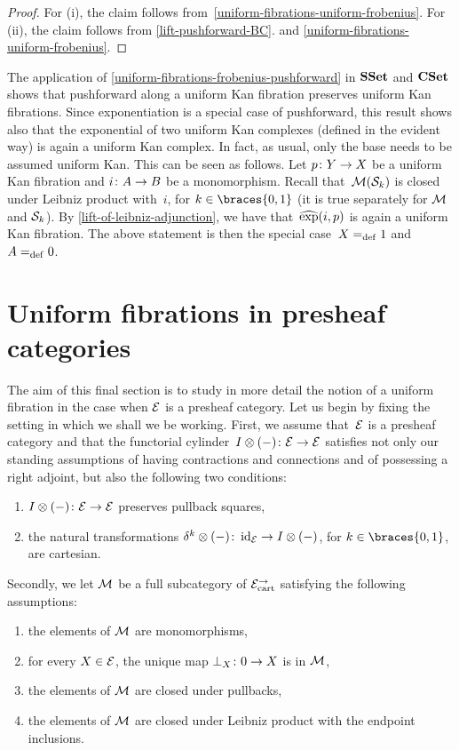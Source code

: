 \documentclass[reqno,10pt,a4paper,oneside,draft]{amsart}
\begin{document}
{{\begin{proof}
For (i), the claim follows from~\cref{uniform-fibrations-uniform-frobenius}. For (ii), the claim follows from \cref{lift-pushforward-BC}.
and \cref{uniform-fibrations-uniform-frobenius}.
\end{proof}


\begin{example} The application of \cref{uniform-fibrations-frobenius-pushforward} in $\SSet$
and $\CSet$ shows that pushforward along a uniform Kan fibration preserves uniform Kan fibrations. 
Since exponentiation is a special case of pushforward, this result shows also that the exponential of two uniform Kan complexes (defined in the evident way) is again a uniform Kan complex.
In fact, as usual, only the base needs to be assumed uniform Kan. This can be seen as follows.
Let $p \co Y \to X$ be a uniform Kan fibration and $i \co A \to B$ be a monomorphism.
Recall that~$\cal{M}(\cal{S}_k)$ is closed under Leibniz product with~$i$, for $k \in \braces{0, 1}$ (it is true separately for $\cal{M}$ and $\cal{S}_k$).
By \cref{lift-of-leibniz-adjunction}, we have that~$\hatexp(i, p)$ is again a uniform Kan fibration.
The above statement is then the special case~$X \defeq 1$ and $A \defeq 0$.
\end{example} 


\section{Uniform fibrations in presheaf categories}
\label{sec:fib-psh}

The aim of this final section is to study in more detail the notion of a uniform fibration in the case when $\cal{E}$ is a presheaf category.  Let us begin by fixing the setting in which we shall we
be working.  First, we assume that~$\cal{E}$ is a presheaf category and that the functorial cylinder~$\interval \otimes (-) \co \cal{E} \to \cal{E}$ satisfies not only
our standing assumptions of having contractions and connections and of possessing a right adjoint, but also the following two conditions: 
\begin{enumerate}[({C}1)] 
\item $\interval \otimes (-) \co \cal{E} \to \cal{E}$ preserves pullback squares,
\item the natural transformations $\kcyl \otimes (-) \co \id_\cal{E} \to \interval \otimes (-)$, for $k \in \braces{ 0, 1}$, are cartesian.
\end{enumerate} 
Secondly, we let $\cal{M}$ be a full subcategory of $\cal{E}^\to_\cart$ satisfying the following assumptions:
\begin{enumerate}[({M}1)] 
\item the elements of $\cal{M}$ are monomorphisms,
\item for every $X \in \cal{E}$, the unique map $\bot_X \co 0 \to X$ is in $\cal{M}$, 
\item the elements of $\cal{M}$ are closed under pullbacks,
\item the elements of $\cal{M}$ are closed under Leibniz product with the endpoint inclusions.
\end{enumerate} 


}}
\end{document}
